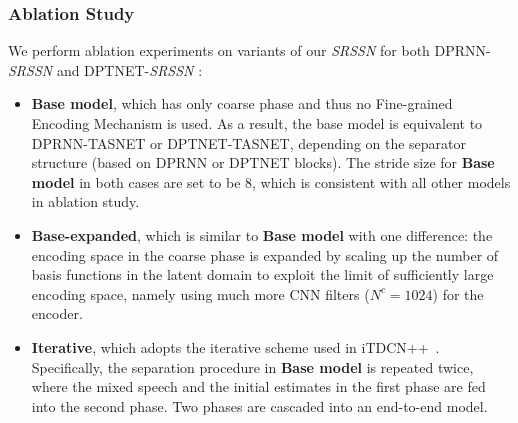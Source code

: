 \subsubsection{Ablation Study}
\label{sssec:ablation}
We perform ablation experiments on  variants of our \emph{SRSSN} for both DPRNN-\emph{SRSSN} and DPTNET-\emph{SRSSN} :
\begin{itemize}\setlength{\itemsep}{-0cm}
    \item \textbf{Base model}, which has only coarse phase and thus no Fine-grained Encoding Mechanism is used. As a result, the base model is equivalent to DPRNN-TASNET or DPTNET-TASNET, depending on the separator structure (based on DPRNN or DPTNET blocks). The stride size for \textbf{Base model} in both cases are set to be 8, which is consistent with all other models in ablation study. \item \textbf{Base-expanded}, which is similar to \textbf{Base model} with one difference: the encoding space in the coarse phase is expanded by scaling up the number of basis functions in the latent domain to exploit the limit of sufficiently large encoding space, namely using much more CNN filters ($N^c=1024$) for the encoder. 
    \item \textbf{Iterative}, which adopts the iterative scheme used in iTDCN++~\cite{universal, improving}. Specifically, the separation procedure in \textbf{Base model} is repeated twice, where the mixed speech and the initial estimates in the first phase are fed into the second phase. Two phases are cascaded into an end-to-end model.

\end{itemize}
